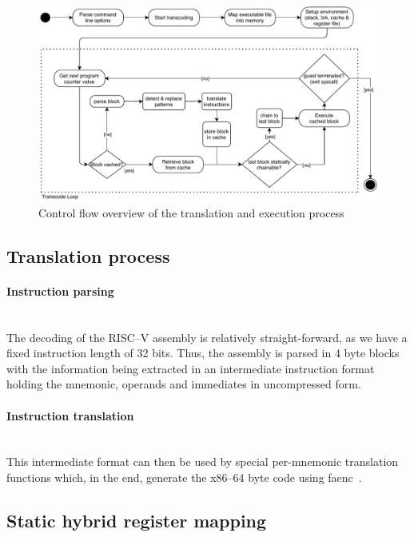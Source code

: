 \begin{figure}[h]
	\begin{center}
		\includegraphics[width=\textwidth]{media/strategy.pdf}
		\caption{Control flow overview of the translation and execution process}
		\label{fig:control-flow-chart}
	\end{center}
\end{figure}

\subsection{Translation process}
\paragraph{Instruction parsing} \mbox{}\\
The decoding of the RISC--V assembly is relatively straight-forward, as we have a fixed instruction length of 32 bits.
Thus, the assembly is parsed in 4 byte blocks with the information being extracted in an intermediate instruction format holding the mnemonic, operands and immediates in uncompressed form.

\paragraph{Instruction translation} \mbox{}\\
This intermediate format can then be used by special per-mnemonic translation functions which, in the end, generate the x86--64 byte code using faenc~\cite{faenc}.


\subsection{Static hybrid register mapping}
